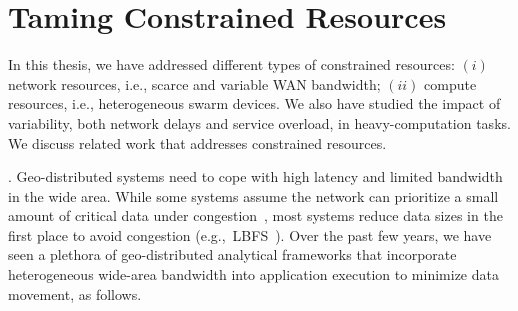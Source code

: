 \documentclass[thesis.tex]{subfiles}
\begin{document}


\section{Taming Constrained Resources}
\label{sec:taming-constr-reso}

In this thesis, we have addressed different types of constrained resources:
$(i)$ network resources, i.e., scarce and variable WAN bandwidth; $(ii)$ compute
resources, i.e., heterogeneous swarm devices. We also have studied the impact of
variability, both network delays and service overload, in heavy-computation
tasks. We discuss related work that addresses constrained resources.

. Geo-distributed systems need to cope
with high latency and limited bandwidth in the wide area. While some systems
assume the network can prioritize a small amount of critical data under
congestion~\cite{cho2012surviving}, most systems reduce data sizes in the first
place to avoid congestion (e.g.,~LBFS~\cite{muthitacharoen2001low}). Over the
past few years, we have seen a plethora of geo-distributed analytical frameworks
that incorporate heterogeneous wide-area bandwidth into application execution to
minimize data movement, as follows.
\end{document}
